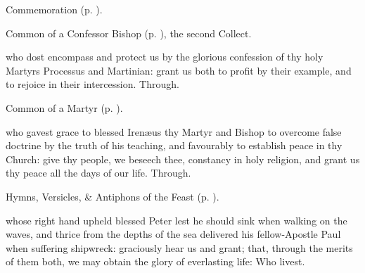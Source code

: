 \begin{rubric}
	 Commemoration  (p. \pageref{ProcessusCollect}).
\end{rubric}



\begin{rubric}
	Common of a Confessor Bishop (p. \pageref{ConfessorBishopCollect}), the second Collect.
\end{rubric}



\memorialCollect\label{ProcessusCollect}
 who dost encompass and protect us by the glorious confession of thy holy Martyrs Processus and Martinian: grant us both to profit by their example, and to rejoice in their intercession. Through.


\clearpage
{}

\begin{rubric}
	Common of a Martyr (p. \pageref{CommonMartyr}).
\end{rubric}

{} who gavest grace to blessed Iren{\ae}us thy Martyr and Bishop to overcome false doctrine by the truth of his teaching, and favourably to establish peace in thy Church: give thy people, we beseech thee, constancy in holy religion, and grant us thy peace all the days of our life. Through.



\begin{rubric}
	Hymns, Versicles, \& Antiphons of the Feast (p. \pageref{SaintPeter}).
\end{rubric}

{} whose right hand upheld blessed Peter lest he should sink when walking on the waves, and thrice from the depths of the sea delivered his fellow-Apostle Paul when suffering shipwreck: graciously hear us and grant; that, through the merits of them both, we may obtain the glory of everlasting life: Who livest.


